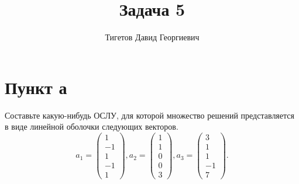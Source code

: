 \documentclass[12pt]{article}
\begin{document}
    \title{Задача 5}
    \author{Тигетов Давид Георгиевич}
    \date{}
    \maketitle

    \section*{Пункт а}
    Составьте какую-нибудь ОСЛУ, для которой множество решений представляется в виде линейной оболочки следующих векторов.
    \[
        a_1 =
        \begin{pmatrix}
            1 \\ -1 \\ 1 \\ -1 \\ 1
        \end{pmatrix},
        a_2 =
        \begin{pmatrix}
            1 \\ 1 \\ 0 \\ 0 \\ 3
        \end{pmatrix},
        a_3 =
        \begin{pmatrix}
            3 \\ 1 \\ 1 \\ -1 \\ 7
        \end{pmatrix}.
    \]
\end{document}

